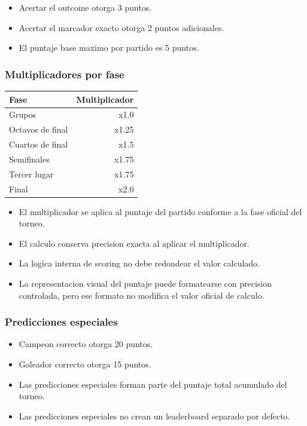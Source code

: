 \begin{itemize}
  \item Acertar el outcome otorga 3 puntos.
  \item Acertar el marcador exacto otorga 2 puntos adicionales.
  \item El puntaje base maximo por partido es 5 puntos.
\end{itemize}

\subsubsection{Multiplicadores por fase}

\begin{center}
\begin{tabular}{lr}
\toprule
Fase & Multiplicador \\
\midrule
Grupos & x1.0 \\
Octavos de final & x1.25 \\
Cuartos de final & x1.5 \\
Semifinales & x1.75 \\
Tercer lugar & x1.75 \\
Final & x2.0 \\
\bottomrule
\end{tabular}
\end{center}

\begin{itemize}
  \item El multiplicador se aplica al puntaje del partido conforme a la fase oficial del torneo.
  \item El calculo conserva precision exacta al aplicar el multiplicador.
  \item La logica interna de scoring no debe redondear el valor calculado.
  \item La representacion visual del puntaje puede formatearse con precision controlada, pero ese formato no modifica el valor oficial de calculo.
\end{itemize}

\subsubsection{Predicciones especiales}

\begin{itemize}
  \item Campeon correcto otorga 20 puntos.
  \item Goleador correcto otorga 15 puntos.
  \item Las predicciones especiales forman parte del puntaje total acumulado del torneo.
  \item Las predicciones especiales no crean un leaderboard separado por defecto.
\end{itemize}

